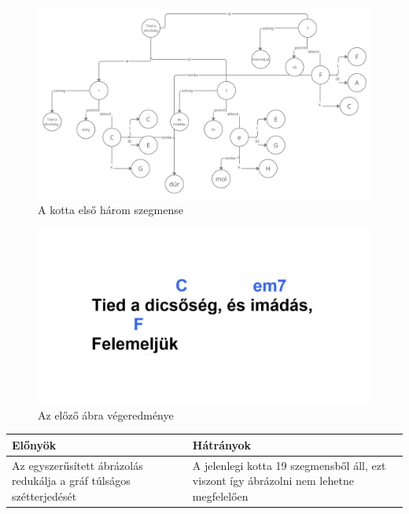 \begin{figure}[h]
	\includegraphics[scale=0.16]{images/representation_of_sheet.png}
	\caption{A kotta első három szegmense}
	\label{fig:repres1}
\end{figure}

\begin{figure}[h]
	\includegraphics[scale=0.26]{images/representated_sheet.png}
	\caption{Az előző ábra végeredménye}
	\label{fig:repres2}
\end{figure}

\begin{center}
	\begin{tabular}{ |p{7cm}|p{7cm}| }
		\hline
		Előnyök & Hátrányok\\
		\hline
		Az egyszerűsített ábrázolás redukálja a gráf túlságos szétterjedését & A jelenlegi kotta 19 szegmensből áll, ezt viszont így ábrázolni nem lehetne megfelelően \\ 
		\hline
	\end{tabular}
\end{center}
